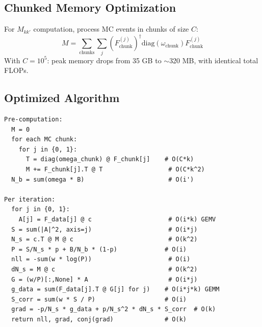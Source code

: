 \documentclass[11pt,a4paper]{article}
\begin{document}
\subsection{Chunked Memory Optimization}

For $M_{kk'}$ computation, process MC events in chunks of size $C$:
\begin{equation}
M = \sum_{\text{chunks}} \sum_j \left(F^{(j)}_{\text{chunk}}\right)^\dagger \text{diag}(\omega_{\text{chunk}}) F^{(j)}_{\text{chunk}}
\end{equation}
With $C = 10^5$: peak memory drops from 35 GB to $\sim$320 MB, with identical total FLOPs.

\subsection{Optimized Algorithm}

\begin{verbatim}
Pre-computation:
  M = 0
  for each MC chunk:
    for j in {0, 1}:
      T = diag(omega_chunk) @ F_chunk[j]    # O(C*k)
      M += F_chunk[j].T @ T                  # O(C*k^2)
  N_b = sum(omega * B)                       # O(i')

Per iteration:
  for j in {0, 1}:
    A[j] = F_data[j] @ c                     # O(i*k) GEMV
  S = sum(|A|^2, axis=j)                     # O(i*j)
  N_s = c.T @ M @ c                          # O(k^2)
  P = S/N_s * p + B/N_b * (1-p)             # O(i)
  nll = -sum(w * log(P))                     # O(i)
  dN_s = M @ c                               # O(k^2)
  G = (w/P)[:,None] * A                      # O(i*j)
  g_data = sum(F_data[j].T @ G[j] for j)    # O(i*j*k) GEMM
  S_corr = sum(w * S / P)                   # O(i)
  grad = -p/N_s * g_data + p/N_s^2 * dN_s * S_corr  # O(k)
  return nll, grad, conj(grad)              # O(k)
\end{verbatim}
\end{document}
